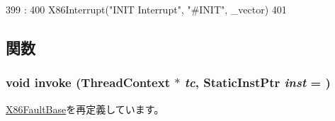 \begin{DoxyCode}
399                                        :
400             X86Interrupt("INIT Interrupt", "#INIT", _vector)
401         {}

\end{DoxyCode}


\subsection{関数}
\hypertarget{classX86ISA_1_1InitInterrupt_a2bd783b42262278d41157d428e1f8d6f}{
\subsubsection[{invoke}]{\setlength{\rightskip}{0pt plus 5cm}void invoke ({\bf ThreadContext} $\ast$ {\em tc}, \/  {\bf StaticInstPtr} {\em inst} = {})}}
\label{classX86ISA_1_1InitInterrupt_a2bd783b42262278d41157d428e1f8d6f}


\hyperlink{classX86ISA_1_1X86FaultBase_a2bd783b42262278d41157d428e1f8d6f}{X86FaultBase}を再定義しています。


